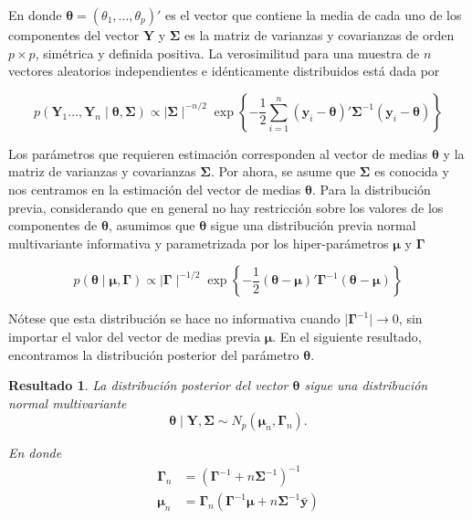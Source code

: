 \documentclass[
  10pt,
  spanish,
]{book}
\newtheorem{proposition}{Resultado}[chapter]
\theoremstyle{definition}
\theoremstyle{definition}
\theoremstyle{definition}
\theoremstyle{definition}
\theoremstyle{remark}
\begin{document}
En donde \(\boldsymbol \theta=(\theta_1,\ldots,\theta_p)'\) es el vector que contiene la media de cada uno de los componentes del vector \(\mathbf{Y}\) y \(\boldsymbol \Sigma\) es la matriz de varianzas y covarianzas de orden \(p\times p\), simétrica y definida positiva. La verosimilitud para una muestra de \(n\) vectores aleatorios independientes e idénticamente distribuidos está dada por

\begin{equation*}
  p(\mathbf{Y}_1\ldots,\mathbf{Y}_n \mid \boldsymbol \theta,\boldsymbol \Sigma)\propto \mid \boldsymbol \Sigma\mid ^{-n/2}
  \exp\left\{-\frac{1}{2}\sum_{i=1}^n(\mathbf{y}_i-\boldsymbol \theta)'\boldsymbol \Sigma^{-1}(\mathbf{y}_i-\boldsymbol \theta)\right\}
\end{equation*}

Los parámetros que requieren estimación corresponden al vector de medias \(\boldsymbol \theta\) y la matriz de varianzas y covarianzas \(\boldsymbol \Sigma\). Por ahora, se asume que \(\boldsymbol \Sigma\) es conocida y nos centramos en la estimación del vector de medias \(\boldsymbol \theta\). Para la distribución previa, considerando que en general no hay restricción sobre los valores de los componentes de \(\boldsymbol \theta\), asumimos que \(\boldsymbol \theta\) sigue una distribución previa normal multivariante informativa y parametrizada por los hiper-parámetros \(\boldsymbol \mu\) y \(\boldsymbol \Gamma\)

\begin{equation*}
p(\boldsymbol \theta\mid \boldsymbol \mu,\boldsymbol \Gamma)\propto \mid \boldsymbol \Gamma\mid ^{-1/2}
\exp\left\{-\frac{1}{2}(\boldsymbol \theta-\boldsymbol \mu)'\boldsymbol \Gamma^{-1}(\boldsymbol \theta-\boldsymbol \mu)\right\}
\end{equation*}

Nótese que esta distribución se hace no informativa cuando \(\mid \boldsymbol \Gamma^{-1} \mid \longrightarrow 0\), sin importar el valor del vector de medias previa \(\boldsymbol \mu\). En el siguiente resultado, encontramos la distribución posterior del parámetro \(\boldsymbol \theta\).

\begin{proposition}
\protect\hypertarget{prp:unnamed-chunk-23}{}{\label{prp:unnamed-chunk-23} }La distribución posterior del vector \(\boldsymbol \theta\) sigue una distribución normal multivariante
\begin{equation*}
\boldsymbol \theta\mid \mathbf{Y},\boldsymbol \Sigma\sim N_p (\boldsymbol \mu_n,\boldsymbol \Gamma_n).
\end{equation*}

En donde
\begin{align}
\boldsymbol \Gamma_n &= \left(\boldsymbol \Gamma^{-1}+n\boldsymbol \Sigma^{-1}\right)^{-1}\label{Gamma_n}\\
\boldsymbol \mu_n &= \boldsymbol \Gamma_n(\boldsymbol \Gamma^{-1}\boldsymbol \mu+n \boldsymbol \Sigma^{-1}\bar{\mathbf{y}})\label{mu_n}
\end{align}
\end{proposition}
\end{document}
